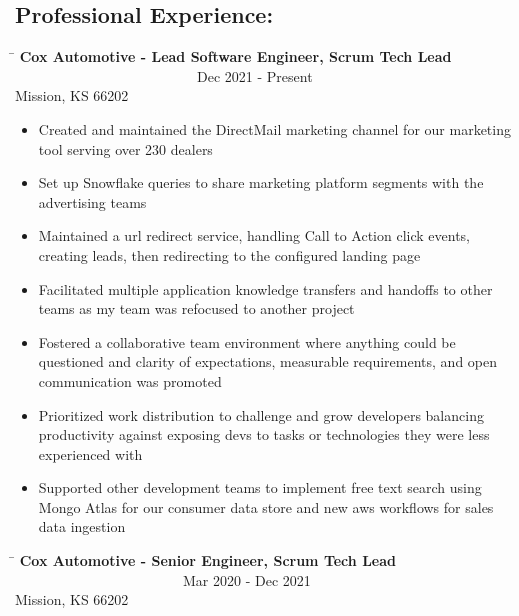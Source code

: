 \documentclass{res}
\begin{document}
\begin{resume}
\section{Professional Experience:}
	\begin{changemargin}{-0.25in}{0in}
	\begin{tabbing}
	\hspace{5.5in}\= \kill 
	{\bf Cox Automotive - Lead Software Engineer, Scrum Tech Lead} \>~~~~~~~~~~~~~~~~~~~~~~~~~~Dec 2021 - Present\\
	Mission, KS 66202
	\end{tabbing}\vspace{-1pt}
	\begin{itemize}
        \item Created and maintained the DirectMail marketing channel for our marketing tool serving over 230 dealers
		\item Set up Snowflake queries to share marketing platform segments with the advertising teams
		\item Maintained a url redirect service, handling Call to Action click events, creating leads, then redirecting to the configured landing page
		\item Facilitated multiple application knowledge transfers and handoffs to other teams as my team was refocused to another project
		\item Fostered a collaborative team environment where anything could be questioned and clarity of expectations, measurable requirements, and open communication was promoted
		\item Prioritized work distribution to challenge and grow developers balancing productivity against exposing devs to tasks or technologies they were less experienced with
		\item Supported other development teams to implement free text search using Mongo Atlas for our consumer data store and new aws workflows for sales data ingestion
		\vspace{-15pt}
	\end{itemize}
	\vspace{0.2in}
	\begin{tabbing}
	\hspace{5.5in}\= \kill 
	{\bf Cox Automotive - Senior Engineer, Scrum Tech Lead} \>~~~~~~~~~~~~~~~~~~~~~~~~Mar 2020 - Dec 2021\\
	Mission, KS 66202
	\end{tabbing}\vspace{-1pt}
	\begin{itemize}

\end{itemize}
\end{changemargin}
\end{resume}
\end{document}
